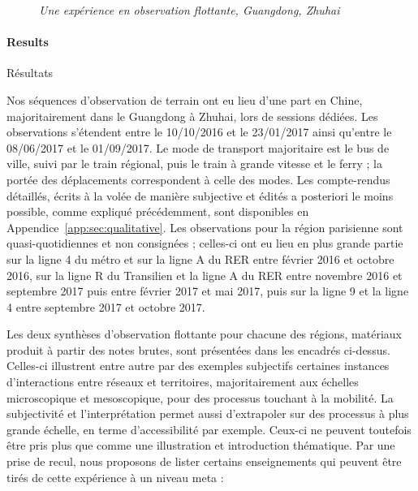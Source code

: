\begin{figure}[h!]
\begin{mdframed}
\medskip

 \textit{Une expérience en observation flottante, Guangdong, Zhuhai}
\end{mdframed}
\end{figure}



\paragraph{Results}{Résultats}

Nos séquences d'observation de terrain ont eu lieu d'une part en Chine, majoritairement dans le Guangdong à Zhuhai, lors de sessions dédiées. Les observations s'étendent entre le 10/10/2016 et le 23/01/2017 ainsi qu'entre le 08/06/2017 et le 01/09/2017. Le mode de transport majoritaire est le bus de ville, suivi par le train régional, puis le train à grande vitesse et le ferry ; la portée des déplacements correspondent à celle des modes. Les compte-rendus détaillés, écrits à la volée de manière subjective et édités a posteriori le moins possible, comme expliqué précédemment, sont disponibles en Appendice~\ref{app:sec:qualitative}. Les observations pour la région parisienne sont quasi-quotidiennes et non consignées ; celles-ci ont eu lieu en plus grande partie sur la ligne 4 du métro et sur la ligne A du RER entre février 2016 et octobre 2016, sur la ligne R du Transilien et la ligne A du RER entre novembre 2016 et septembre 2017 puis entre février 2017 et mai 2017, puis sur la ligne 9 et la ligne 4 entre septembre 2017 et octobre 2017.


Les deux synthèses d'observation flottante pour chacune des régions, matériaux produit à partir des notes brutes, sont présentées dans les encadrés ci-dessus. Celles-ci illustrent entre autre par des exemples subjectifs certaines instances d'interactions entre réseaux et territoires, majoritairement aux échelles microscopique et mesoscopique, pour des processus touchant à la mobilité. La subjectivité et l'interprétation permet aussi d'extrapoler sur des processus à plus grande échelle, en terme d'accessibilité par exemple. Ceux-ci ne peuvent toutefois être pris plus que comme une illustration et introduction thématique. Par une prise de recul, nous proposons de lister certains enseignements qui peuvent être tirés de cette expérience à un niveau meta :

